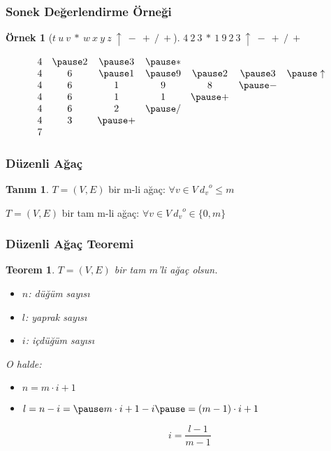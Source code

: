 \documentclass[dvipsnames]{beamer}
\theoremstyle{definition}
\newtheorem{tanim}[theorem]{Tanım}
\theoremstyle{example}
\newtheorem{ornek}[theorem]{Örnek}
\theoremstyle{plain}
\newtheorem{teorem}[theorem]{Teorem}
\begin{document}
\begin{frame}
  \frametitle{Sonek Değerlendirme Örneği}

  \begin{ornek}[$t ~ u ~ v ~ * ~ w ~ x ~ y ~ z ~ \uparrow ~ - ~ + ~ / ~ +$]
    $4 ~ 2 ~ 3 ~ * ~ 1 ~ 9 ~ 2 ~ 3 ~ \uparrow ~ - ~ + ~ / ~ +$

    \pause
    \medskip
    \[
      \begin{array}{ccccccc}
  4 & \pause 2 & \pause 3 & \pause * &          &          &                \\
  4 &        6 & \pause 1 & \pause 9 & \pause 2 & \pause 3 & \pause \uparrow\\
  4 &        6 &        1 &        9 &        8 & \pause - &                \\
  4 &        6 &        1 &        1 & \pause + &          &                \\
  4 &        6 &        2 & \pause / &          &          &                \\
  4 &        3 & \pause + &          &          &          &                \\
  7 &          &          &          &          &          &                \\
      \end{array}
    \]
  \end{ornek}
\end{frame}

\begin{frame}
  \frametitle{Düzenli Ağaç}

  \begin{tanim}
    $T=(V,E)$ bir \alert{m-li ağaç}: $\forall v \in V~{d_v}^o \leq m$

    \bigskip
    $T=(V,E)$ bir tam m-li ağaç:
      $\forall v \in V~{d_v}^o \in \{0,m\}$
  \end{tanim}
\end{frame}

\begin{frame}
  \frametitle{Düzenli Ağaç Teoremi}

  \begin{teorem}
    $T=(V,E)$ bir tam $m$'li ağaç olsun.

    \begin{itemize}
      \item $n$: düğüm sayısı
      \item $l$: yaprak sayısı
      \item $i$: içdüğüm sayısı
    \end{itemize}

    O halde:
    \pause
    \begin{itemize}
      \item $n = m \cdot i + 1$

      \pause
      \item  $l = n - i = \pause m \cdot i + 1 - i
        \pause = (m - 1) \cdot i + 1$

      \pause
      \[
        i = \frac{l - 1}{m - 1}
      \]
    \end{itemize}
  \end{teorem}
\end{frame}
\end{document}
